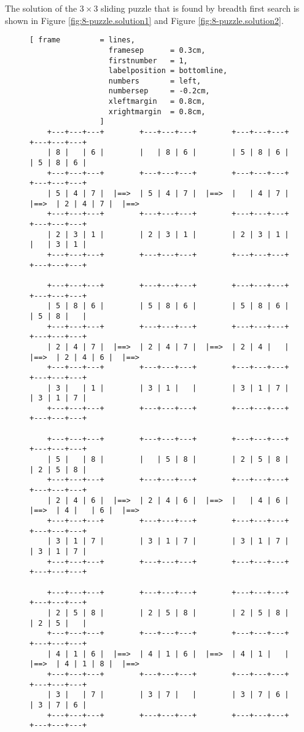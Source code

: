 The solution of the $3 \times 3$ sliding puzzle that is found by breadth first search is shown in
Figure \ref{fig:8-puzzle.solution1} and Figure \ref{fig:8-puzzle.solution2}.

\begin{figure}[!ht]
\centering
\begin{Verbatim}[ frame         = lines,
                  framesep      = 0.3cm,
                  firstnumber   = 1,
                  labelposition = bottomline,
                  numbers       = left,
                  numbersep     = -0.2cm,
                  xleftmargin   = 0.8cm,
                  xrightmargin  = 0.8cm,
                ]
    +---+---+---+        +---+---+---+        +---+---+---+        +---+---+---+
    | 8 |   | 6 |        |   | 8 | 6 |        | 5 | 8 | 6 |        | 5 | 8 | 6 |
    +---+---+---+        +---+---+---+        +---+---+---+        +---+---+---+
    | 5 | 4 | 7 |  |==>  | 5 | 4 | 7 |  |==>  |   | 4 | 7 |  |==>  | 2 | 4 | 7 |  |==>
    +---+---+---+        +---+---+---+        +---+---+---+        +---+---+---+
    | 2 | 3 | 1 |        | 2 | 3 | 1 |        | 2 | 3 | 1 |        |   | 3 | 1 |
    +---+---+---+        +---+---+---+        +---+---+---+        +---+---+---+

    +---+---+---+        +---+---+---+        +---+---+---+        +---+---+---+
    | 5 | 8 | 6 |        | 5 | 8 | 6 |        | 5 | 8 | 6 |        | 5 | 8 |   |
    +---+---+---+        +---+---+---+        +---+---+---+        +---+---+---+
    | 2 | 4 | 7 |  |==>  | 2 | 4 | 7 |  |==>  | 2 | 4 |   |  |==>  | 2 | 4 | 6 |  |==>
    +---+---+---+        +---+---+---+        +---+---+---+        +---+---+---+
    | 3 |   | 1 |        | 3 | 1 |   |        | 3 | 1 | 7 |        | 3 | 1 | 7 |
    +---+---+---+        +---+---+---+        +---+---+---+        +---+---+---+

    +---+---+---+        +---+---+---+        +---+---+---+        +---+---+---+
    | 5 |   | 8 |        |   | 5 | 8 |        | 2 | 5 | 8 |        | 2 | 5 | 8 |
    +---+---+---+        +---+---+---+        +---+---+---+        +---+---+---+
    | 2 | 4 | 6 |  |==>  | 2 | 4 | 6 |  |==>  |   | 4 | 6 |  |==>  | 4 |   | 6 |  |==>
    +---+---+---+        +---+---+---+        +---+---+---+        +---+---+---+
    | 3 | 1 | 7 |        | 3 | 1 | 7 |        | 3 | 1 | 7 |        | 3 | 1 | 7 |
    +---+---+---+        +---+---+---+        +---+---+---+        +---+---+---+

    +---+---+---+        +---+---+---+        +---+---+---+        +---+---+---+
    | 2 | 5 | 8 |        | 2 | 5 | 8 |        | 2 | 5 | 8 |        | 2 | 5 |   |
    +---+---+---+        +---+---+---+        +---+---+---+        +---+---+---+
    | 4 | 1 | 6 |  |==>  | 4 | 1 | 6 |  |==>  | 4 | 1 |   |  |==>  | 4 | 1 | 8 |  |==>
    +---+---+---+        +---+---+---+        +---+---+---+        +---+---+---+
    | 3 |   | 7 |        | 3 | 7 |   |        | 3 | 7 | 6 |        | 3 | 7 | 6 |
    +---+---+---+        +---+---+---+        +---+---+---+        +---+---+---+


\end{Verbatim}
\end{figure}
